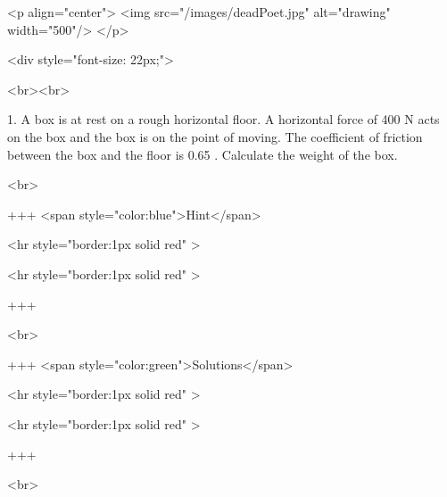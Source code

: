 <p align="center">
<img src="/images/deadPoet.jpg" alt="drawing" width="500"/>
</p>

<div style="font-size: 22px;">

<br><br>

1. A box is at rest on a rough horizontal floor. A horizontal force of 400 N acts on the box and the box is on the point of moving. The coefficient of friction between the box and the floor is 0.65 . Calculate the weight of the box.

<br>

+++ <span style="color:blue">Hint</span>

<hr style="border:1px solid red" >

<hr style="border:1px solid red" >

+++

<br>

+++ <span style="color:green">Solutions</span>

<hr style="border:1px solid red" >

<hr style="border:1px solid red" >

+++

<br>

